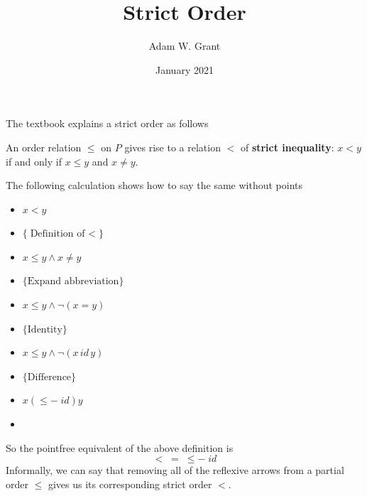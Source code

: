 \documentclass{article}
\title{Strict Order}
\author{Adam W. Grant}
\date{January 2021}
\begin{document}
\maketitle

The textbook \cite{davey_priestley_2002} explains a strict order as follows
\begin{displayquote}
An order relation $\leq$ on $P$ gives rise to a relation $<$ of \textbf{strict inequality}: $x < y$ if and only if $x \leq y$ and $x\neq y$.
\end{displayquote}
The following calculation shows how to say the same without points
\begin{itemize}
    \item $x < y$
    \item[$\equiv$] $\{\text{Definition of $<$}\}$
    \item[] $x \leq y \wedge x \neq y$
    \item[$\equiv$] $\{\text{Expand abbreviation}\}$
    \item[] $x \leq y \wedge \neg (x = y)$
    \item[$\equiv$] $\{\text{Identity}\}$
    \item[] $x \leq y \wedge \neg (x \,id\, y)$
    \item[$\equiv$] $\{\text{Difference}\}$
    \item[] $x (\leq - \;id) y$
    \item[\Heart]
\end{itemize}
So the pointfree equivalent of the above definition is
\begin{equation*}
    < \;= \; \leq - \;id
\end{equation*}
Informally, we can say that removing all of the reflexive arrows from a partial order $\leq$ gives us its corresponding strict order $<$.



\end{document}
